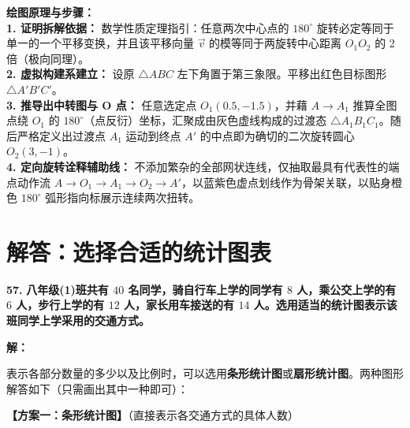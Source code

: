 \documentclass[12pt, a4paper]{ctexrep}
\begin{document}
\vspace{0.4cm}
{\small\color{blue!70!black}
\textbf{绘图原理与步骤：}\\
\textbf{1. 证明拆解依据：} 数学性质定理指引：任意两次中心点的 $180^\circ$ 旋转必定等同于单一的一个平移变换，并且该平移向量 $\vec{v}$ 的模等同于两旋转中心距离 $O_1 O_2$ 的 2 倍（极向同理）。\\
\textbf{2. 虚拟构建系建立：} 设原 $\triangle ABC$ 左下角置于第三象限。平移出红色目标图形 $\triangle A'B'C'$。\\
\textbf{3. 推导出中转图与 O 点：} 任意选定点 $O_1(0.5, -1.5)$，并藉 $A \to A_1$ 推算全图点绕 $O_1$ 的 $180^\circ$（点反衍）坐标，汇聚成由灰色虚线构成的过渡态 $\triangle A_1B_1C_1$。随后严格定义出过渡点 $A_1$ 运动到终点 $A'$ 的中点即为确切的二次旋转圆心 $O_2(3,-1)$。\\
\textbf{4. 定向旋转诠释辅助线：} 不添加繁杂的全部网状连线，仅抽取最具有代表性的端点动作流 $A \to O_1 \to A_1 \to O_2 \to A'$，以蓝紫色虚点划线作为骨架关联，以贴身橙色 $180^\circ$ 弧形指向标展示连续两次扭转。
}

\newpage

\section{解答：选择合适的统计图表}

\vspace{0.6cm}

\textbf{\LARGE 57.} \textbf{八年级(1)班共有 $40$ 名同学，骑自行车上学的同学有 $8$ 人，乘公交上学的有 $6$ 人，步行上学的有 $12$ 人，家长用车接送的有 $14$ 人。选用适当的统计图表示该班同学上学采用的交通方式。}

\vspace{0.4cm}
\textbf{解：}

表示各部分数量的多少以及比例时，可以选用\textbf{条形统计图}或\textbf{扇形统计图}。两种图形解答如下（只需画出其中一种即可）：

\vspace{0.4cm}
\textbf{【方案一：条形统计图】}（直接表示各交通方式的具体人数）
\end{document}
